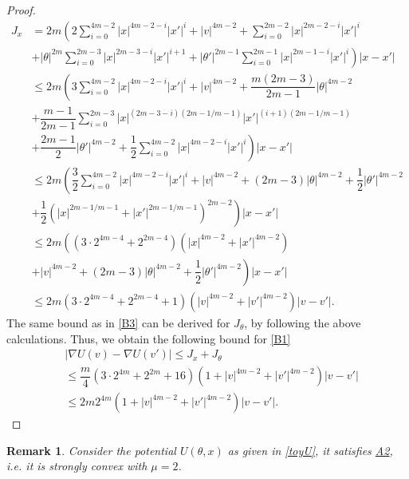 \documentclass[a4paper, 10pt]{article}
\theoremstyle{plain}%
\newtheorem{remark}{Remark}
\begin{document}
\begin{proof}
\begin{align}
    J_x&=2m\left(2\sum_{i=0}^{4m-2}|x|^{4m-2-i}|x'|^{i}+|v|^{4m-2}+\sum_{i=0}^{2m-2}|x|^{2m-2-i}|x'|^{i}\right.\nonumber\\
    &\left.+|\theta|^{2m}\sum_{i=0}^{2m-3}|x|^{2m-3-i}|x'|^{i+1}+|\theta'|^{2m-1}\sum_{i=0}^{2m-1}|x|^{2m-1-i}|x'|^i\right)|x-x'|\nonumber\\
    &\leq2m\left(3\sum_{i=0}^{4m-2}|x|^{4m-2-i}|x'|^{i}+|v|^{4m-2}+\dfrac{m(2m-3)}{2m-1}|\theta|^{4m-2}\right.\nonumber\\
    &+\dfrac{m-1}{2m-1}\sum_{i=0}^{2m-3}|x|^{(2m-3-i)(2m-1/m-1)}|x'|^{(i+1)(2m-1/m-1)}\nonumber\\
    &\left.+\dfrac{2m-1}{2}|\theta'|^{4m-2}+\dfrac{1}{2}\sum_{i=0}^{4m-2}|x|^{4m-2-i}|x'|^{i}\right)|x-x'|\nonumber\\
    &\leq2m\left(\dfrac{3}{2}\sum_{i=0}^{4m-2}|x|^{4m-2-i}|x'|^{i}+|v|^{4m-2}+(2m-3)|\theta|^{4m-2}+\dfrac{1}{2}|\theta'|^{4m-2}\right.\nonumber\\
    &\left.+\dfrac{1}{2}\left(|x|^{2m-1/m-1}+|x'|^{2m-1/m-1}\right)^{2m-2}\right)|x-x'|\nonumber\\
    &\leq2m\left(\left(3\cdot2^{4m-4}+2^{2m-4}\right)\left(|x|^{4m-2}+|x'|^{4m-2}\right)\right.\nonumber\\
    &\left.+|v|^{4m-2}+(2m-3)|\theta|^{4m-2}+\dfrac{1}{2}|\theta'|^{4m-2}\right)|x-x'|\nonumber\\
    &\leq 2m\left(3\cdot 2^{4m-4}+2^{2m-4}+1\right)\left(|v|^{4m-2}+|v'|^{4m-2}\right)|v-v'|.\label{B3}
\end{align}
The same bound as in \eqref{B3} can be derived for $J_{\theta}$, by following the above calculations. Thus, we obtain the following bound for \eqref{B1}
\begin{align}
    &|\nabla U(v)-\nabla U(v')|\leq J_x+J_{\theta}\nonumber\\&\leq \dfrac{m}{4}\left(3\cdot2^{4m}+2^{2m}+16\right)\left(1+|v|^{4m-2}+|v'|^{4m-2}\right)|v-v'|\nonumber\\
    &\leq 2m2^{4m}\left(1+|v|^{4m-2}+|v'|^{4m-2}\right)|v-v'|.\label{B4}
\end{align}
\end{proof}
\begin{remark}\label{remark6}
    Consider the potential $U(\theta,x)$ as given in \eqref{toyU}, it satisfies \hyperlink{Assum2}{A2}, i.e. it is strongly convex with $\mu=2$.
\end{remark}
\end{document}
